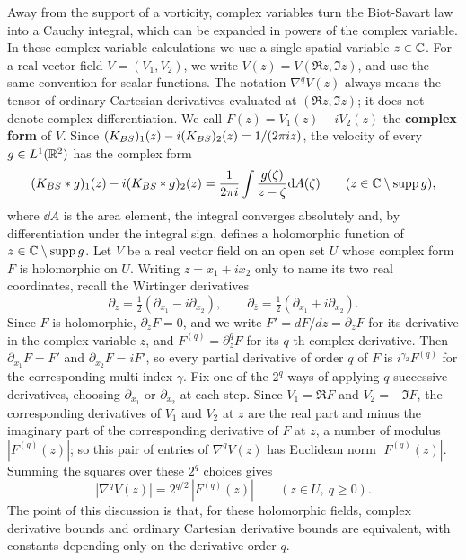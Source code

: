 Away from the support of a vorticity, complex variables turn the Biot-Savart
law into a Cauchy integral, which can be expanded in powers of the complex
variable.
In these complex-variable calculations we use a single spatial variable
$z\in\mathbb{C}$. For a real vector field $V=(V_1,V_2)$, we write
$V(z)=V(\Re z,\Im z)$, and use the same convention for scalar functions.
The notation $\nabla^qV(z)$ always means the tensor of ordinary Cartesian
derivatives evaluated at $(\Re z,\Im z)$; it does not denote complex
differentiation. We call $F(z)=V_1(z)-iV_2(z)$ the \textbf{complex form} of
$V$.
Since $(K_{BS})_1(z)-i(K_{BS})_2(z)=1/(2\pi iz)$,
the velocity of every $g\in L^1(\mathbb{R}^2)$ has the complex form
\begin{equation}
\label{eq:BS-complex}
(K_{BS}\ast g)_1(z)-i(K_{BS}\ast g)_2(z)=\frac1{2\pi i}\int\frac{g(\zeta)}{z-\zeta}\dd A(\zeta)
\qquad(z\in\mathbb{C}\setminus\operatorname{supp} g),
\end{equation}
where $\dd A$ is the area element, the integral converges absolutely and, by differentiation under the
integral sign, defines a holomorphic function of $z\in\mathbb{C}\setminus\operatorname{supp} g$. Let
$V$ be a real vector field on an open set $U$ whose complex form $F$ is
holomorphic on $U$. Writing $z=x_1+ix_2$ only to name its two real
coordinates, recall the Wirtinger derivatives
\[
\partial_z=\tfrac12(\partial_{x_1}-i\partial_{x_2}),\qquad
\partial_{\bar z}=\tfrac12(\partial_{x_1}+i\partial_{x_2}).
\]
Since $F$ is holomorphic, $\partial_{\bar z}F=0$, and we write
$F'=dF/dz=\partial_zF$ for its derivative in the complex variable $z$, and
$F^{(q)}=\partial_z^qF$ for its $q$-th complex derivative.
Then $\partial_{x_1}F=F'$ and $\partial_{x_2}F=iF'$, so every
partial derivative of order $q$ of $F$ is $i^{\gamma_2}F^{(q)}$ for the
corresponding multi-index $\gamma$. Fix one of the $2^q$ ways of applying $q$
successive derivatives, choosing $\partial_{x_1}$ or $\partial_{x_2}$ at each
step. Since $V_1=\Re F$ and $V_2=-\Im F$, the corresponding derivatives of
$V_1$ and $V_2$ at $z$ are the real part and minus the imaginary part of the
corresponding derivative of $F$ at $z$, a number of modulus $|F^{(q)}(z)|$; so this
pair of entries of $\nabla^qV(z)$ has Euclidean norm $|F^{(q)}(z)|$. Summing the
squares over these $2^q$ choices gives
\begin{equation}
\label{eq:BS-complex-deriv}
|\nabla^qV(z)|=2^{q/2}\,|F^{(q)}(z)|\qquad(z\in U,\ q\ge0).
\end{equation}
The point of this discussion is that, for these holomorphic fields, complex
derivative bounds and ordinary Cartesian derivative bounds are equivalent,
with constants depending only on the derivative order $q$.

